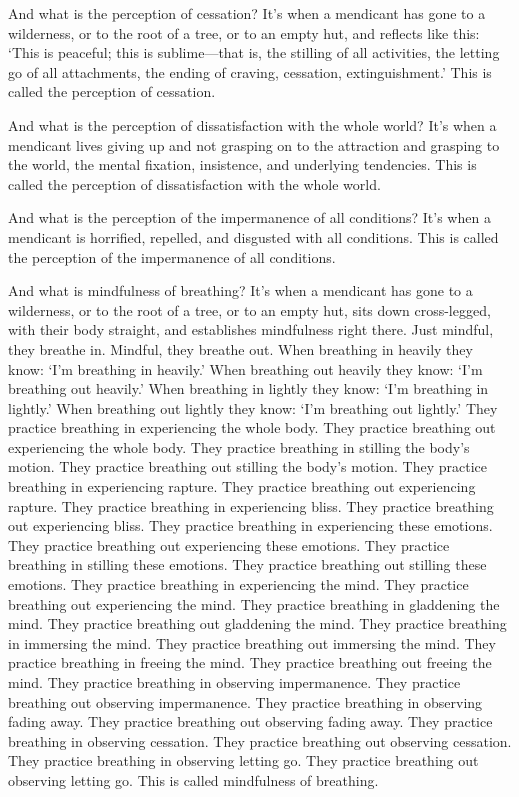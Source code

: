 \documentclass[12pt,openany]{book}%
\begin{document}
And what is the perception of cessation? It’s when a mendicant has gone to a wilderness, or to the root of a tree, or to an empty hut, and reflects like this: ‘This is peaceful; this is sublime—that is, the stilling of all activities, the letting go of all attachments, the ending of craving, cessation, extinguishment.’ This is called the perception of cessation. 

And what is the perception of dissatisfaction with the whole world? It’s when a mendicant lives giving up and not grasping on to the attraction and grasping to the world, the mental fixation, insistence, and underlying tendencies. This is called the perception of dissatisfaction with the whole world. 

And what is the perception of the impermanence of all conditions? It’s when a mendicant is horrified, repelled, and disgusted with all conditions. This is called the perception of the impermanence of all conditions. 

And what is mindfulness of breathing? It’s when a mendicant has gone to a wilderness, or to the root of a tree, or to an empty hut, sits down cross-legged, with their body straight, and establishes mindfulness right there. Just mindful, they breathe in. Mindful, they breathe out. When breathing in heavily they know: ‘I’m breathing in heavily.’ When breathing out heavily they know: ‘I’m breathing out heavily.’ When breathing in lightly they know: ‘I’m breathing in lightly.’ When breathing out lightly they know: ‘I’m breathing out lightly.’ They practice breathing in experiencing the whole body. They practice breathing out experiencing the whole body. They practice breathing in stilling the body’s motion. They practice breathing out stilling the body’s motion. They practice breathing in experiencing rapture. They practice breathing out experiencing rapture. They practice breathing in experiencing bliss. They practice breathing out experiencing bliss. They practice breathing in experiencing these emotions. They practice breathing out experiencing these emotions. They practice breathing in stilling these emotions. They practice breathing out stilling these emotions. They practice breathing in experiencing the mind. They practice breathing out experiencing the mind. They practice breathing in gladdening the mind. They practice breathing out gladdening the mind. They practice breathing in immersing the mind. They practice breathing out immersing the mind. They practice breathing in freeing the mind. They practice breathing out freeing the mind. They practice breathing in observing impermanence. They practice breathing out observing impermanence. They practice breathing in observing fading away. They practice breathing out observing fading away. They practice breathing in observing cessation. They practice breathing out observing cessation. They practice breathing in observing letting go. They practice breathing out observing letting go. This is called mindfulness of breathing. 
\end{document}
